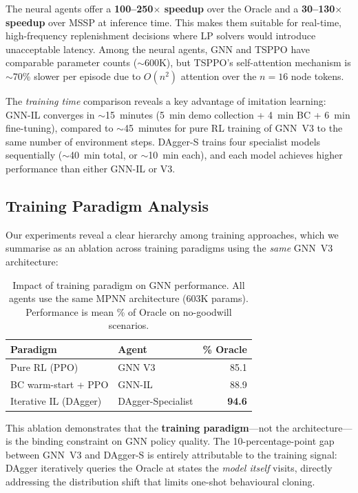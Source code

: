 The neural agents offer a \textbf{100--250$\times$ speedup} over the Oracle
and a \textbf{30--130$\times$ speedup} over MSSP at inference time. This
makes them suitable for real-time, high-frequency replenishment decisions
where LP solvers would introduce unacceptable latency. Among the neural
agents, GNN and TSPPO have comparable parameter counts ($\sim$600K), but
TSPPO's self-attention mechanism is $\sim$70\% slower per episode due to
$O(n^2)$ attention over the $n{=}16$ node tokens.

The \emph{training time} comparison reveals a key advantage of imitation
learning: GNN-IL converges in $\sim$15~minutes (5~min demo collection
+ 4~min BC + 6~min fine-tuning), compared to $\sim$45~minutes for
pure RL training of GNN~V3 to the same number of environment steps.
DAgger-S trains four specialist models sequentially ($\sim$40~min total,
or $\sim$10~min each), and each model achieves higher performance
than either GNN-IL or V3.

\subsection{Training Paradigm Analysis}\label{sec:paradigms}

Our experiments reveal a clear hierarchy among training approaches,
which we summarise as an ablation across training paradigms using the
\emph{same} GNN~V3 architecture:

\begin{table}[htbp]
\centering
\caption{Impact of training paradigm on GNN performance. All agents use the
same MPNN architecture (603K params). Performance is mean \% of Oracle on
no-goodwill scenarios.}
\label{tab:paradigm_ablation}
\small
\begin{tabular}{llr}
\toprule
\textbf{Paradigm} & \textbf{Agent} & \textbf{\% Oracle} \\
\midrule
Pure RL (PPO) & GNN V3 & 85.1 \\
BC warm-start + PPO & GNN-IL & 88.9 \\
Iterative IL (DAgger) & DAgger-Specialist & \textbf{94.6} \\
\bottomrule
\end{tabular}
\end{table}

\noindent This ablation demonstrates that the \textbf{training paradigm}---not
the architecture---is the binding constraint on GNN policy quality.
The 10-percentage-point gap between GNN~V3 and DAgger-S is entirely
attributable to the training signal: DAgger iteratively queries the Oracle
at states the \emph{model itself} visits, directly addressing the
distribution shift that limits one-shot behavioural cloning.

